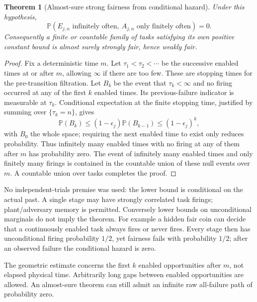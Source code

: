 \documentclass[11pt]{article}
\newtheorem{theorem}{Theorem}\newtheorem{proposition}{Proposition}
\begin{document}
\begin{theorem}[Almost-sure strong fairness from conditional hazard]
Under this hypothesis,
\[
 {\mathbb P}(E_{j,n}\text{ infinitely often},\
 A_{j,n}\text{ only finitely often})=0.
\]
Consequently a finite or countable family of tasks satisfying its own positive constant bound is almost surely strongly fair, hence weakly fair.
\end{theorem}
\begin{proof}
Fix a deterministic time $m$. Let $\tau_1<\tau_2<\cdots$ be the successive enabled times at or after $m$, allowing $\infty$ if there are too few. These are stopping times for the pre-transition filtration. Let $B_k$ be the event that $\tau_k<\infty$ and no firing occurred at any of the first $k$ enabled times. Its previous-failure indicator is measurable at $\tau_k$. Conditional expectation at the finite stopping time, justified by summing over $\{\tau_k=n\}$, gives
\[
 {\mathbb P}(B_k)\le(1-\epsilon_j){\mathbb P}(B_{k-1})
 \le(1-\epsilon_j)^k,
\]
with $B_0$ the whole space; requiring the next enabled time to exist only reduces probability. Thus infinitely many enabled times with no firing at any of them after $m$ has probability zero. The event of infinitely many enabled times and only finitely many firings is contained in the countable union of these null events over $m$. A countable union over tasks completes the proof.
\end{proof}

No independent-trials premise was used: the lower bound is conditional on the actual past. A single stage may have strongly correlated task firings; plant/adversary memory is permitted. Conversely lower bounds on unconditional marginals do not imply the theorem. For example a hidden fair coin can decide that a continuously enabled task always fires or never fires. Every stage then has unconditional firing probability $1/2$, yet fairness fails with probability $1/2$; after an observed failure the conditional hazard is zero.

The geometric estimate concerns the first $k$ enabled opportunities after $m$, not elapsed physical time. Arbitrarily long gaps between enabled opportunities are allowed. An almost-sure theorem can still admit an infinite raw all-failure path of probability zero.
\end{document}
